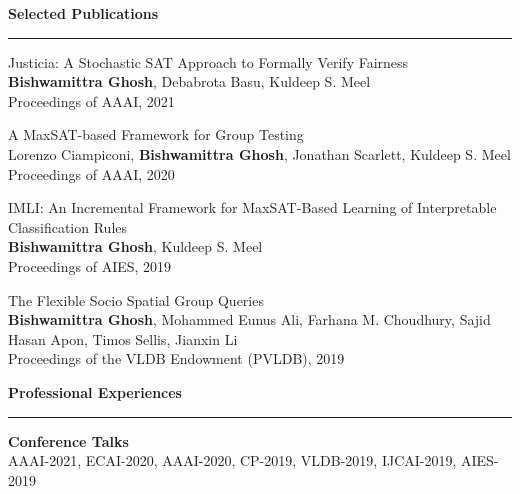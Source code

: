 \documentclass[a4paper,11pt,final]{article}
\newcommand{\Sep}{\vspace{1.5em}}
\newcommand{\SmallSep}{\vspace{0.5em}}
\begin{document}
\Sep
\Large { \textbf{Selected Publications}}\\
\noindent\rule{\textwidth}{1pt}
\normalsize


	

	
	
\SmallSep

	\begin{enumerate}[{[}1{]}]
		\item {Justicia: A Stochastic SAT Approach to Formally Verify Fairness} \\
		\textbf{Bishwamittra Ghosh}, Debabrota Basu, Kuldeep S. Meel\\
		Proceedings of AAAI, 2021
		\item 	{A MaxSAT-based Framework for Group Testing} \\
		Lorenzo Ciampiconi, \textbf{Bishwamittra Ghosh}, Jonathan Scarlett, Kuldeep S. Meel\\
		Proceedings of AAAI, 2020
		\item {IMLI: An Incremental Framework for MaxSAT-Based Learning of Interpretable \\ Classification Rules}\\
		\textbf{Bishwamittra Ghosh}, Kuldeep S. Meel\\
		Proceedings of AIES, 2019
		\item 	{The Flexible Socio Spatial Group Queries}\\
		\textbf{Bishwamittra Ghosh}, Mohammed Eunus Ali, Farhana M. Choudhury,
		Sajid Hasan Apon, Timos Sellis, Jianxin Li\\
		Proceedings of the VLDB Endowment (PVLDB), 2019\\
		
	\end{enumerate}





%

\Sep
\newpage
\Large { \textbf{Professional Experiences}}\\
\noindent\rule{\textwidth}{1pt}
\normalsize
\textbf{Conference Talks}\\
AAAI-2021, ECAI-2020, AAAI-2020, CP-2019, VLDB-2019, IJCAI-2019, AIES-2019
\end{document}
